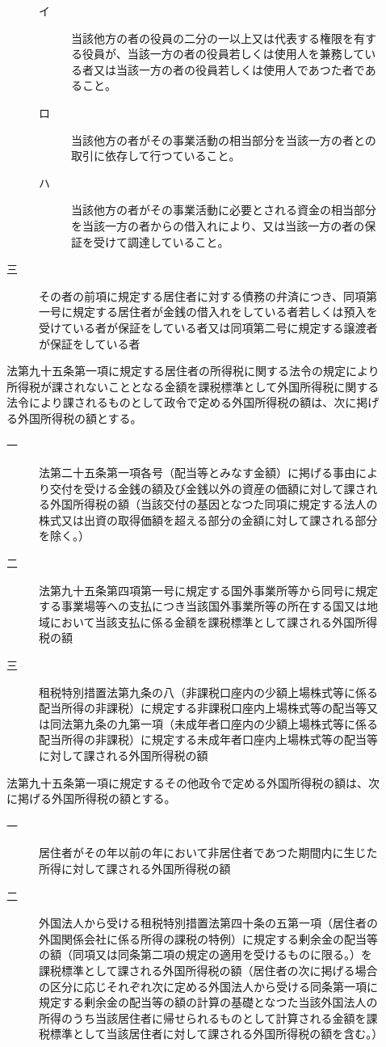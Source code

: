 \documentclass[twocolumn,a4j,10pt]{ltjtarticle}
\begin{document}
\begin{description}
\begin{description}
\begin{description}
\item[イ]当該他方の者の役員の二分の一以上又は代表する権限を有する役員が、当該一方の者の役員若しくは使用人を兼務している者又は当該一方の者の役員若しくは使用人であつた者であること。
\item[ロ]当該他方の者がその事業活動の相当部分を当該一方の者との取引に依存して行つていること。
\item[ハ]当該他方の者がその事業活動に必要とされる資金の相当部分を当該一方の者からの借入れにより、又は当該一方の者の保証を受けて調達していること。
\end{description}
\item[三]その者の前項に規定する居住者に対する債務の弁済につき、同項第一号に規定する居住者が金銭の借入れをしている者若しくは預入を受けている者が保証をしている者又は同項第二号に規定する譲渡者が保証をしている者
\end{description}
\item[\rensuji{3}]法第九十五条第一項に規定する居住者の所得税に関する法令の規定により所得税が課されないこととなる金額を課税標準として外国所得税に関する法令により課されるものとして政令で定める外国所得税の額は、次に掲げる外国所得税の額とする。
\begin{description}
\item[一]法第二十五条第一項各号（配当等とみなす金額）に掲げる事由により交付を受ける金銭の額及び金銭以外の資産の価額に対して課される外国所得税の額（当該交付の基因となつた同項に規定する法人の株式又は出資の取得価額を超える部分の金額に対して課される部分を除く。）
\item[二]法第九十五条第四項第一号に規定する国外事業所等から同号に規定する事業場等への支払につき当該国外事業所等の所在する国又は地域において当該支払に係る金額を課税標準として課される外国所得税の額
\item[三]租税特別措置法第九条の八（非課税口座内の少額上場株式等に係る配当所得の非課税）に規定する非課税口座内上場株式等の配当等又は同法第九条の九第一項（未成年者口座内の少額上場株式等に係る配当所得の非課税）に規定する未成年者口座内上場株式等の配当等に対して課される外国所得税の額
\end{description}
\item[\rensuji{4}]法第九十五条第一項に規定するその他政令で定める外国所得税の額は、次に掲げる外国所得税の額とする。
\begin{description}
\item[一]居住者がその年以前の年において非居住者であつた期間内に生じた所得に対して課される外国所得税の額
\item[二]外国法人から受ける租税特別措置法第四十条の五第一項（居住者の外国関係会社に係る所得の課税の特例）に規定する剰余金の配当等の額（同項又は同条第二項の規定の適用を受けるものに限る。）を課税標準として課される外国所得税の額（居住者の次に掲げる場合の区分に応じそれぞれ次に定める外国法人から受ける同条第一項に規定する剰余金の配当等の額の計算の基礎となつた当該外国法人の所得のうち当該居住者に帰せられるものとして計算される金額を課税標準として当該居住者に対して課される外国所得税の額を含む。）

\end{description}
\end{description}
\end{document}
